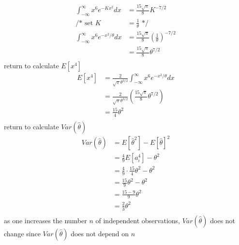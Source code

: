 \documentclass[12pt,border=4pt,multi]{article} %
\begin{document}
\begin{align*}
\int_{-\infty}^{\infty} x^6 e^{-Kx^2} dx &= \frac{15\sqrt{\pi}}{8}K^{-7 / 2}\\
\text{/* set } K &= \frac{1}{\theta} \text{ */}\\
\int_{-\infty}^{\infty} x^6 e^{-x^2 / \theta} dx &= \frac{15\sqrt{\pi}}{8}\left(\frac{1}{\theta}\right)^{-7 / 2}\\
&= \frac{15\sqrt{\pi}}{8}\theta^{7 / 2}\\
\end{align*}
return to calculate $E[x^4]$
\begin{align*}
E[x^4] &= \frac{2}{\sqrt{\pi}\theta^{3 / 2}} \int_{-\infty}^{\infty} x^6 e^{-x^2 / \theta} dx\\
&= \frac{2}{\sqrt{\pi}\theta^{3 / 2}} \left(\frac{15\sqrt{\pi}}{8}\theta^{7 / 2}\right)\\
&= \frac{15}{4}\theta^2\\
\end{align*}
return to calculate $Var(\hat{\theta})$
\begin{align*}
Var(\hat{\theta}) &= E[\hat{\theta}^2] - E[\hat{\theta}]^2\\
&= \frac{4}{9}E\left[a_i^4\right] - \theta^2\\
&= \frac{4}{9}\cdot\frac{15}{4}\theta^2 - \theta^2\\
&= \frac{15}{9}\theta^2 - \theta^2\\
&= \frac{15 - 9}{9}\theta^2\\
&= \boxed{\frac{2}{3}\theta^2}\\
\end{align*}
as one increases the number $n$ of independent observations, $Var(\hat{\theta})$ does not change since $Var(\hat{\theta})$ does not depend on $n$\\
\end{document}

